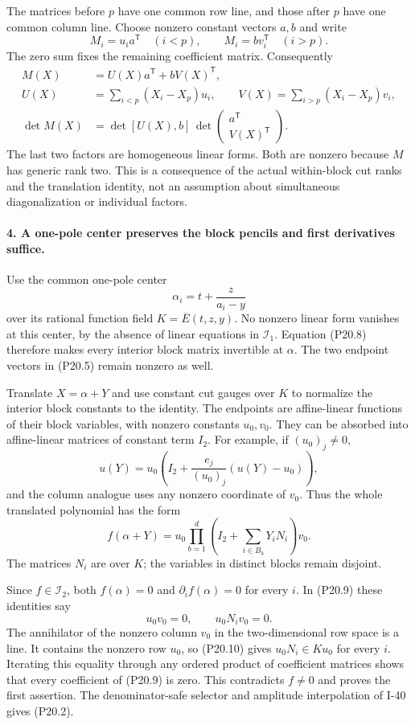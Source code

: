 The matrices before $p$ have one common row line, and
those after $p$ have one common column line. Choose
nonzero constant vectors $a,b$ and write
\[
 M_i=u_i a^{\mathsf T}\quad(i<p),\qquad
 M_i=b v_i^{\mathsf T}\quad(i>p).
\]
The zero sum fixes the remaining coefficient matrix.
Consequently
\[
 \begin{aligned}
 M(X)&=U(X)a^{\mathsf T}+bV(X)^{\mathsf T},\\
 U(X)&=\sum_{i<p}(X_i-X_p)u_i,\qquad
 V(X)=\sum_{i>p}(X_i-X_p)v_i,\\
 \det M(X)&=\det[U(X),b]\,
                  \det\begin{pmatrix}a^{\mathsf T}\\V(X)^{\mathsf T}\end{pmatrix}.
 \end{aligned}
 \tag{P20.8}
\]
The last two factors are homogeneous linear forms.
Both are nonzero because $M$ has generic rank two.
This is a consequence of the actual within-block cut
ranks and the translation identity, not an assumption
about simultaneous diagonalization or individual factors.

\paragraph{4. A one-pole center preserves the block pencils and first derivatives suffice.}
Use the common one-pole center
\[
                  \alpha_i=t+\frac{z}{a_i-y}
\]
over its rational function field $K=\overline E(t,z,y)$.
No nonzero linear form vanishes at this center, by the
absence of linear equations in $\mathcal I_1$.
Equation (P20.8) therefore makes every interior block
matrix invertible at $\alpha$. The two endpoint vectors
in (P20.5) remain nonzero as well.

Translate $X=\alpha+Y$ and use constant cut gauges over
$K$ to normalize the interior block constants to the
identity. The endpoints are affine-linear functions of
their block variables, with nonzero constants $u_0,v_0$.
They can be absorbed into affine-linear matrices of
constant term $I_2$. For example, if $(u_0)_j\ne0$,
\[
 u(Y)=u_0\left(I_2+
       \frac{e_j}{(u_0)_j}(u(Y)-u_0)\right),
\]
and the column analogue uses any nonzero coordinate of
$v_0$. Thus the whole translated polynomial has the form
\[
 f(\alpha+Y)=u_0
   \prod_{b=1}^{d}\left(I_2+
                  \sum_{i\in B_b}Y_i N_i\right)v_0.
 \tag{P20.9}
\]
The matrices $N_i$ are over $K$; the variables in distinct
blocks remain disjoint.

Since $f\in\mathcal I_2$, both $f(\alpha)=0$ and
$\partial_i f(\alpha)=0$ for every $i$. In (P20.9) these
identities say
\[
                  u_0v_0=0,\qquad u_0N_i v_0=0.
 \tag{P20.10}
\]
The annihilator of the nonzero column $v_0$ in the
two-dimensional row space is a line. It contains the
nonzero row $u_0$, so (P20.10) gives
$u_0N_i\in K u_0$ for every $i$. Iterating this equality
through any ordered product of coefficient matrices
shows that every coefficient of (P20.9) is zero. This
contradicts $f\ne0$ and proves the first assertion.
The denominator-safe selector and amplitude interpolation
of I-40 gives (P20.2).

